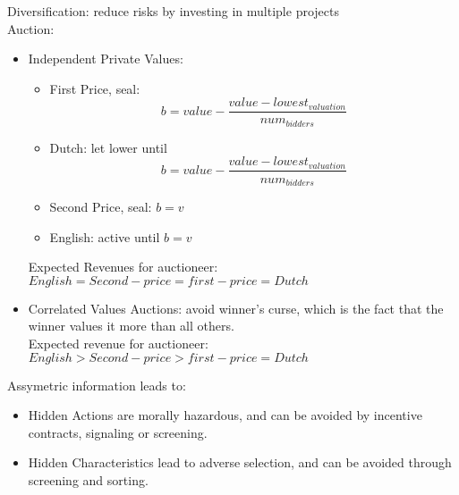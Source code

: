 \documentclass[nobib,fleqn,8pt]{article}
\begin{document}
Diversification: reduce risks by investing in multiple projects\\
Auction:
\begin{itemize}
    \item Independent Private Values:
          \begin{itemize}
              \item First Price, seal: \begin{equation*}
                        b = value-\frac{value-lowest_{valuation}}{num_{bidders}}
                    \end{equation*}
              \item Dutch: let lower until \begin{equation*}
                        b = value-\frac{value-lowest_{valuation}}{num_{bidders}}
                    \end{equation*}
              \item Second Price, seal: $b = v$
              \item English: active until $b=v$
          \end{itemize}
          Expected Revenues for auctioneer: $English = Second-price = first-price = Dutch$
    \item Correlated Values Auctions: avoid winner's curse, which is the fact that the
          winner values it more than all others.\\ Expected revenue for auctioneer:
          $English>Second-price>first-price=Dutch$
\end{itemize}
Assymetric information leads to:
\begin{itemize}
    \item Hidden Actions are morally hazardous, and can be avoided by incentive
          contracts, signaling or screening.
    \item Hidden Characteristics lead to adverse selection, and can be avoided through
          screening and sorting.
\end{itemize}
\end{document}

